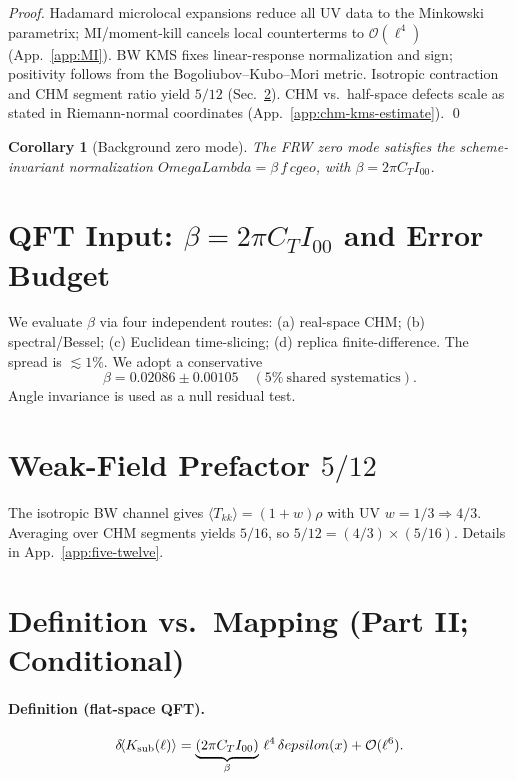 \documentclass[aps,prd,onecolumn,superscriptaddress,nofootinbib]{revtex4-2}
\def\OmL{OmegaLambda}%
\def\cgeo{cgeo}%
\def\eps{epsilon}%
\def\Omega_\Lambda{OmegaLambda}%
\providecommand{\OmL}{\Omega_\Lambda}
\providecommand{\cgeo}{c_{\rm geo}}
\providecommand{\eps}{\varepsilon}
\providecommand{\be}{\begin{equation}}
\providecommand{\ee}{\end{equation}}
\newtheorem{corollary}{Corollary}
\begin{document}
\noindent\emph{Proof.} Hadamard microlocal expansions reduce all UV data to the Minkowski parametrix; MI/moment-kill cancels local counterterms to \(\mathcal O(\ell^4)\) (App.~\ref{app:MI}). BW KMS fixes linear-response normalization and sign; positivity follows from the Bogoliubov--Kubo--Mori metric. Isotropic contraction and CHM segment ratio yield \(5/12\) (Sec.~\ref{sec:five-twelve}). CHM vs.\ half-space defects scale as stated in Riemann-normal coordinates (App.~\ref{app:chm-kms-estimate}). \qed

\begin{corollary}[Background zero mode]
The FRW zero mode satisfies the scheme-invariant normalization
\(\OmL=\beta\,f\,\cgeo\), with \(\beta=2\pi C_T I_{00}\).
\end{corollary}

\section{QFT Input: \texorpdfstring{$\beta=2\pi C_T I_{00}$}{beta} and Error Budget}
\label{sec:beta}
We evaluate \(\beta\) via four independent routes: (a) real-space CHM; (b) spectral/Bessel; (c) Euclidean time-slicing; (d) replica finite-difference. The spread is \(\lesssim 1\%\). We adopt a conservative
\be
\beta=0.02086\pm 0.00105 \quad (5\%~\text{shared systematics}).
\ee
Angle invariance is used as a null residual test.

\section{Weak-Field Prefactor \texorpdfstring{$5/12$}{5/12}}
\label{sec:five-twelve}
The isotropic BW channel gives \(\langle T_{kk}\rangle=(1+w)\rho\) with UV \(w=1/3\Rightarrow 4/3\). Averaging over CHM segments yields \(5/16\), so \(5/12=(4/3)\times(5/16)\). Details in App.~\ref{app:five-twelve}.

\section{Definition vs.\ Mapping (Part II; Conditional)}
\label{sec:def-vs-map}

\paragraph{Definition (flat-space QFT).}
\be
\delta\!\langle K_{\rm sub}(\ell)\rangle=\underbrace{(2\pi C_T I_{00})}_{\beta}\,\ell^4\,\delta\eps(x)+\mathcal O(\ell^6).
\label{eq:eps-def}
\ee
\end{document}
